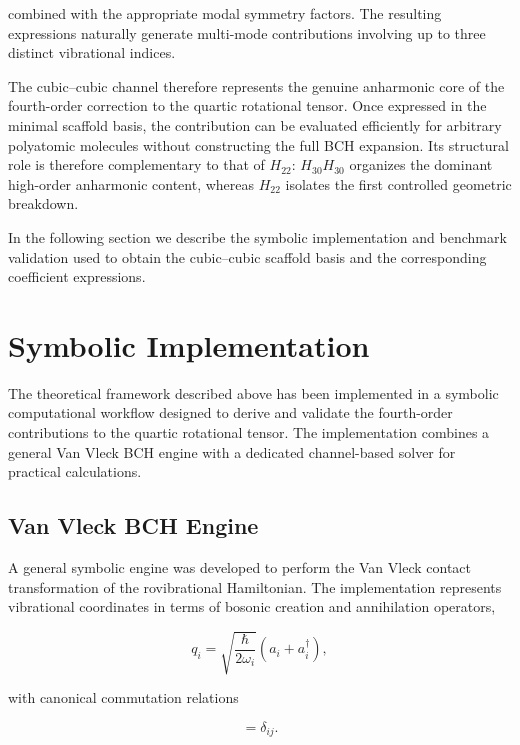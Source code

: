 \documentclass[aip,jcp,reprint]{revtex4-2}
\begin{document}
combined with the appropriate modal symmetry factors.
The resulting expressions naturally generate multi-mode contributions
involving up to three distinct vibrational indices.

The cubic--cubic channel therefore represents the genuine anharmonic
core of the fourth-order correction to the quartic rotational tensor.
Once expressed in the minimal scaffold basis, the contribution can be
evaluated efficiently for arbitrary polyatomic molecules without
constructing the full BCH expansion.
Its structural role is therefore complementary to that of $H_{22}$:
$H_{30}H_{30}$ organizes the dominant high-order anharmonic content,
whereas $H_{22}$ isolates the first controlled geometric breakdown.

In the following section we describe the symbolic implementation and
benchmark validation used to obtain the cubic--cubic scaffold basis
and the corresponding coefficient expressions.

\section{Symbolic Implementation}

The theoretical framework described above has been implemented in a
symbolic computational workflow designed to derive and validate the
fourth-order contributions to the quartic rotational tensor.
The implementation combines a general Van Vleck BCH engine with a
dedicated channel-based solver for practical calculations.

\subsection{Van Vleck BCH Engine}

A general symbolic engine was developed to perform the Van Vleck
contact transformation of the rovibrational Hamiltonian. The
implementation represents vibrational coordinates in terms of bosonic
creation and annihilation operators,
\cite{VanVleck1932,Watson1968JCP}

\begin{equation}
q_i = \sqrt{\frac{\hbar}{2\omega_i}} (a_i + a_i^\dagger),
\end{equation}

with canonical commutation relations

\begin{equation}
[a_i , a_j^\dagger] = \delta_{ij}.
\end{equation}
\end{document}
